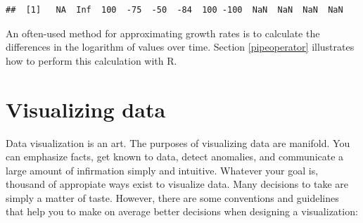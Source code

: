 \documentclass[
  12pt,
  oneside]{book}
\begin{document}
\begin{verbatim}
##  [1]   NA  Inf  100  -75  -50  -84  100 -100  NaN  NaN  NaN  NaN
\end{verbatim}

An often-used method for approximating growth rates is to calculate the differences in the logarithm of values over time. Section \ref{pipeoperator} illustrates how to perform this calculation with R.

\hypertarget{visualizing-data}{%
\chapter{Visualizing data}\label{visualizing-data}}

Data visualization is an art. The purposes of visualizing data are manifold. You can emphasize facts, get known to data, detect anomalies, and communicate a large amount of infirmation simply and intuitive. Whatever your goal is, thousand of appropiate ways exist to visualize data. Many decisions to take are simply a matter of taste. However, there are some conventions and guidelines that help you to make on average better decisions when designing a visualization:
\end{document}
